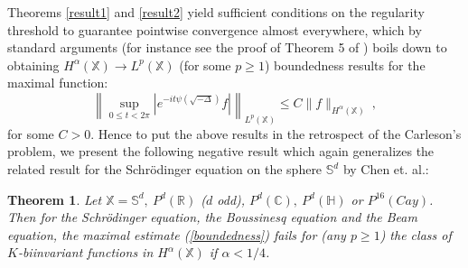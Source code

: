 \documentclass[12pt]{amsart}
\newtheorem{theorem}{Theorem}[section]
\theoremstyle{definition}
\newcommand{\R}{\mathbb R}%
\newcommand{\C}{\mathbb C}%
\newcommand{\Sb}{\mathbb S}%
\newcommand{\X}{\mathbb X}%
\newcommand{\Hb}{\mathbb H}%
\numberwithin{equation}{section}
\begin{document}
Theorems \ref{result1} and \ref{result2} yield sufficient conditions on the regularity threshold to guarantee pointwise convergence almost everywhere, which by standard arguments (for instance see the proof of Theorem 5 of \cite{Sjolin}) boils down to obtaining $H^\alpha(\X) \to L^p(\X)$ (for some $p \ge 1$) boundedness results for the maximal function:
\begin{equation} \label{boundedness}
\left\|\sup_{0 \le t < 2\pi} \left|e^{-it\psi\left(\sqrt{-\Delta}\right)} f \right|\right\|_{L^p(\X)} \le C \|f\|_{H^\alpha(\X)}\:,
\end{equation}
for some $C>0$. Hence to put the above results in the retrospect of the Carleson's problem, we present the following negative result which again generalizes the related result for the Schr\"odinger equation on the sphere $\Sb^d$ \cite[Theorem 1.3]{CDLY} by Chen et. al.: 
\begin{theorem} \label{result3}
Let $\X=\Sb^d,\:P^d(\R)$ ($d$ odd), $P^d(\C),\:P^d(\Hb)$ or $P^{16}(Cay)$. Then for the Schr\"odinger equation, the Boussinesq equation and the Beam equation, the maximal estimate (\ref{boundedness}) fails for (any $p \ge 1$) the class of $K$-biinvariant functions in $H^\alpha(\X)$ if $\alpha <1/4$.
\end{theorem}
\end{document}
